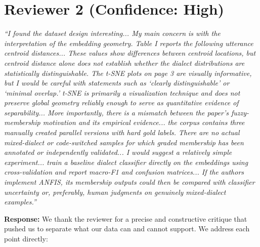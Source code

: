 \documentclass[11pt]{article}
\begin{document}
\section*{Reviewer 2 (Confidence: High)}
\textit{``I found the dataset design interesting... My main concern is with the interpretation of the embedding geometry. Table I reports the following utterance centroid distances... These values show differences between centroid locations, but centroid distance alone does not establish whether the dialect distributions are statistically distinguishable. The t-SNE plots on page 3 are visually informative, but I would be careful with statements such as `clearly distinguishable' or `minimal overlap.' t-SNE is primarily a visualization technique and does not preserve global geometry reliably enough to serve as quantitative evidence of separability... More importantly, there is a mismatch between the paper's fuzzy-membership motivation and its empirical evidence... the corpus contains three manually created parallel versions with hard gold labels. There are no actual mixed-dialect or code-switched samples for which graded membership has been annotated or independently validated... I would suggest a relatively simple experiment... train a baseline dialect classifier directly on the embeddings using cross-validation and report macro-F1 and confusion matrices... If the authors implement ANFIS, its membership outputs could then be compared with classifier uncertainty or, preferably, human judgments on genuinely mixed-dialect examples.''}

\textbf{Response:} We thank the reviewer for a precise and constructive critique that pushed us to separate what our data can and cannot support. We address each point directly:
\end{document}
